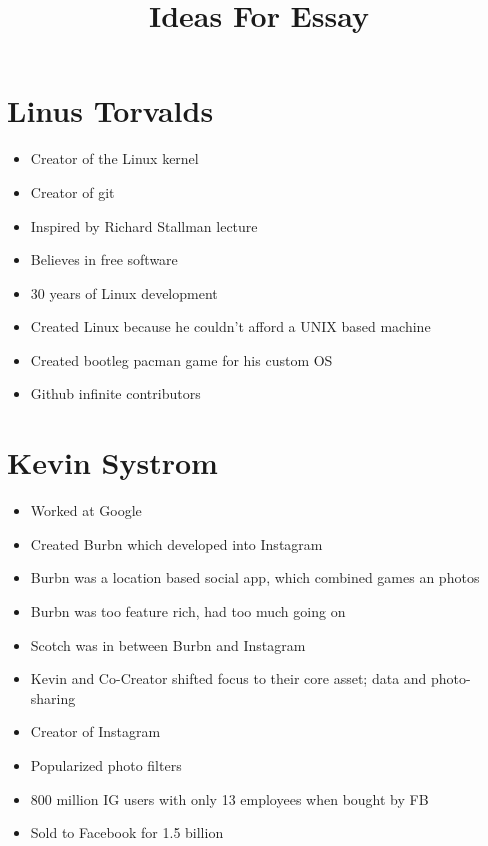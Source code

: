 \documentclass{article}
\title{Ideas For Essay}
\author{}
\date{}
\begin{document}
    \maketitle

    \section{Linus Torvalds}
        \begin{itemize}
            \item Creator of the Linux kernel
            \item Creator of git
            \item Inspired by Richard Stallman lecture
            \item Believes in free software
            \item 30 years of Linux development
            \item Created Linux because he couldn’t afford a UNIX based machine
            \item Created bootleg pacman game for his custom OS
            \item Github infinite contributors
        \end{itemize}

    \section{Kevin Systrom}
        \begin{itemize}
            \item Worked at Google
            \item Created Burbn which developed into Instagram
            \item Burbn was a location based social app, which combined games an photos
            \item Burbn was too feature rich, had too much going on
            \item Scotch was in between Burbn and Instagram
            \item Kevin and Co-Creator shifted focus to their core asset; data and photo-sharing
            \item Creator of Instagram
            \item Popularized photo filters
            \item 800 million IG users with only 13 employees when bought by FB
            \item Sold to Facebook for 1.5 billion
        \end{itemize}
\end{document}
